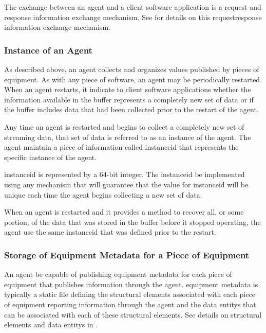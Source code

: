 The exchange between an \gls{agent} and a client software application is a \gls{request} and \gls{response} information exchange mechanism.  See  for details on this \gls{requestresponse} information exchange mechanism.

\subsubsection{Instance of an Agent}
\label{sec:Instance of an Agent}

As described above, an \gls{agent} collects and organizes values published by pieces of equipment.  As with any piece of software, an \gls{agent} may be periodically restarted.  When an \gls{agent} restarts, it \MUST indicate to client software applications whether the information available in the \gls{buffer} represents a completely new set of data or if the \gls{buffer} includes data that had been collected prior to the restart of the \gls{agent}.

Any time an \gls{agent} is restarted and begins to collect a completely new set of \gls{streaming data}, that set of data is referred to as an \gls{instance} of the \gls{agent}.  The \gls{agent} \MUST maintain a piece of information called \gls{instanceid} that represents the specific \gls{instance} of the \gls{agent}.

\gls{instanceid} is represented by a 64-bit integer.  The \gls{instanceid} \MAY be implemented using any mechanism that will guarantee that the value for \gls{instanceid} will be unique each time the \gls{agent} begins collecting a new set of data.

When an \gls{agent} is restarted and it provides a method to recover all, or some portion, of the data that was stored in the \gls{buffer} before it stopped operating, the \gls{agent} \MUST use the same \gls{instanceid} that was defined prior to the restart. 

\subsubsection{Storage of Equipment Metadata for a Piece of Equipment}

An \gls{agent} \MUST be capable of publishing \gls{equipment metadata} for each piece of equipment that publishes information through the \gls{agent}.  \gls{equipment metadata} is typically a static file defining the \glspl{structural element} associated with each piece of equipment reporting information through the \gls{agent} and the \glspl{data entity} that can be associated with each of these \glspl{structural element}.  See details on \glspl{structural element} and \glspl{data entity} in .

